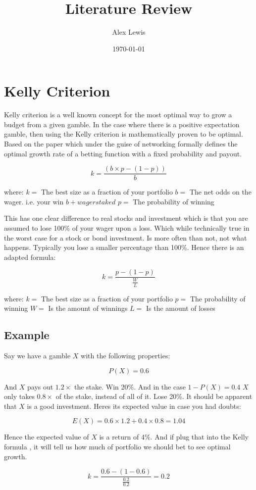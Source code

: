 \documentclass[12pt]{article}
\title{Literature Review}
\author{Alex Lewis}
\date{\today}
\begin{document}
\maketitle
\section{Kelly Criterion}

Kelly criterion is a well known concept for the most optimal way to grow a budget from a given
gamble. In the case where there is a positive expectation gamble, then using the Kelly criterion
is mathematically proven to be optimal. Based on the paper which under the guise of networking
formally defines the optimal growth rate of a betting function with a fixed probability and
payout.

\[ k = \frac{(b \times p - (1 - p))}{b} \]

where:\newline
\(k =\) The best size as a fraction of your portfolio\newline
\(b =\) The net odds on the wager. i.e. your win \(b + wager staked\) \newline
\(p =\) The probability of winning\newline

This has one clear difference to real stocks and investment which is that you are assumed to 
lose 100\% of your wager upon a loss. Which while technically true in the worst case for a 
stock or bond investment. Is more often than not, not what happens. Typically you lose a 
smaller percentage than 100\%. Hence there is an adapted formula: \cite{Alon}

\[ k = \frac{p - (1 - p)}{\frac{W}{L}}\]

where:\newline
\(k =\) The best size as a fraction of your portfolio\newline
\(p =\) The probability of winning\newline
\(W =\) Is the amount of winnings\newline
\(L =\) Is the amount of losses\newline

\subsection{Example}

Say we have a gamble \(X\) with the following properties:

\[P(X) = 0.6\]

And \(X\) pays out \(1.2\times\) the stake. Win 20\%. And in the case \(1 - P(X) = 0.4\) \(X\) 
only takes \(0.8\times\) of the stake, instead of all of it. Lose 20\%. It should be apparent 
that \(X\) is a good investment. Heres its expected value in case you had doubts:

\[E(X) = 0.6 \times 1.2 + 0.4 \times 0.8 = 1.04\]

Hence the expected value of \(X\) is a return of 4\%. And if plug that into the Kelly formula
, it will tell us how much of portfolio we should bet to see optimal growth.

\[k = \frac{0.6 - (1 - 0.6)}{\frac{0.2}{0.2}} = 0.2\]

\pagebreak


\end{document}

